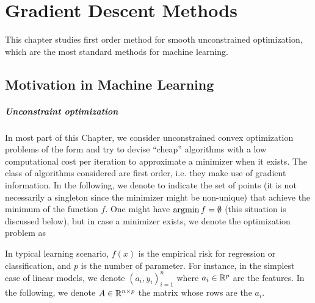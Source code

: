 
\chapter{Gradient Descent Methods}
\label{chap-conv-duality}


This chapter studies first order method for smooth unconstrained optimization, which are the most standard methods for machine learning. 

\section{Motivation in Machine Learning}

\paragraph{Unconstraint optimization}

In most part of this Chapter, we consider unconstrained convex optimization problems of the form 
and try to devise ``cheap'' algorithms with a low computational cost per iteration to approximate a minimizer when it exists. 
%
The class of algorithms considered are first order, i.e. they make use of gradient information. In the following, we denote 
to indicate the set of points (it is not necessarily a singleton since the minimizer might be non-unique) that achieve the minimum of the function $f$. One might have $\operatorname{argmin} f = \emptyset$ (this situation is discussed below), but in case a minimizer exists, we denote the optimization problem as


In typical learning scenario, $f(x)$ is the empirical risk for regression or classification, and $p$ is the number of parameter. For instance, in the simplest case of linear models, we denote $(a_i,y_i)_{i=1}^n$ where $a_i \in \mathbb{R}^p$ are the features. 
%
In the following, we denote $A \in \mathbb{R}^{n \times p}$ the matrix whose rows are the $a_i$.


